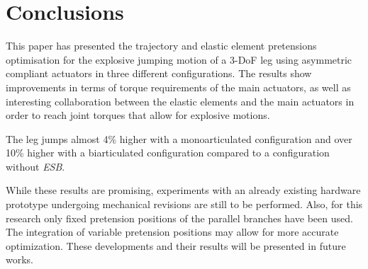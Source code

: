 \documentclass[letterpaper, 10 pt, conference]{ieeeconf}  %
\begin{document}
\section{Conclusions} \label{sec:conclusions} 
This paper has presented the trajectory and elastic element pretensions optimisation for the explosive jumping motion of a 3-DoF leg using asymmetric compliant actuators in three different configurations. The results show improvements in terms of torque requirements of the main actuators, as well as interesting collaboration between the elastic elements and the main actuators in order to reach joint torques that allow for explosive motions.

The leg jumps almost 4\% higher with a monoarticulated configuration and over 10\% higher with a biarticulated configuration compared to a configuration without \textit{ESB}.

While these results are promising, experiments with an already existing hardware prototype undergoing mechanical revisions are still to be performed. Also, for this research only fixed pretension positions of the parallel branches have been used. The integration of variable pretension positions may allow for more accurate optimization. These developments and their results will be presented in future works.
\end{document}
